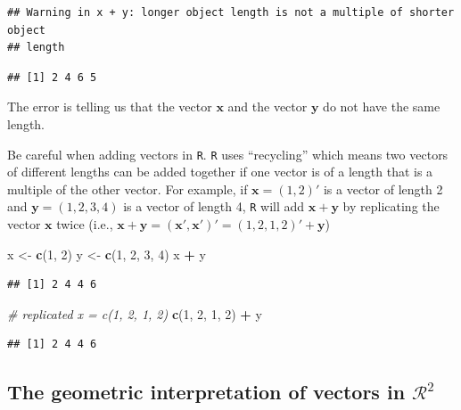 \documentclass[
]{book}
\newenvironment{Shaded}{\begin{snugshade}}{\end{snugshade}}
\newcommand{\CommentTok}[1]{\textcolor[rgb]{0.56,0.35,0.01}{\textit{#1}}}
\newcommand{\DecValTok}[1]{\textcolor[rgb]{0.00,0.00,0.81}{#1}}
\newcommand{\KeywordTok}[1]{\textcolor[rgb]{0.13,0.29,0.53}{\textbf{#1}}}
\newcommand{\NormalTok}[1]{#1}
\newcommand{\OperatorTok}[1]{\textcolor[rgb]{0.81,0.36,0.00}{\textbf{#1}}}
\newcommand{\StringTok}[1]{\textcolor[rgb]{0.31,0.60,0.02}{#1}}
\theoremstyle{definition}
\theoremstyle{definition}
\theoremstyle{definition}
\theoremstyle{remark}
\begin{document}
\begin{verbatim}
## Warning in x + y: longer object length is not a multiple of shorter object
## length
\end{verbatim}

\begin{verbatim}
## [1] 2 4 6 5
\end{verbatim}

The error is telling us that the vector \(\mathbf{x}\) and the vector \(\mathbf{y}\) do not have the same length.

Be careful when adding vectors in \texttt{R}. \texttt{R} uses ``recycling'' which means two vectors of different lengths can be added together if one vector is of a length that is a multiple of the other vector. For example, if \(\mathbf{x} = (1, 2)'\) is a vector of length 2 and \(\mathbf{y} = (1, 2, 3, 4)\) is a vector of length 4, \texttt{R} will add \(\mathbf{x} + \mathbf{y}\) by replicating the vector \(\mathbf{x}\) twice (i.e., \(\mathbf{x} + \mathbf{y} = \left( \mathbf{x}', \mathbf{x}' \right)' = \left(1, 2, 1, 2 \right)' + \mathbf{y}\))

\begin{Shaded}
\begin{Highlighting}[]
\NormalTok{x <-}\StringTok{ }\KeywordTok{c}\NormalTok{(}\DecValTok{1}\NormalTok{, }\DecValTok{2}\NormalTok{)}
\NormalTok{y <-}\StringTok{ }\KeywordTok{c}\NormalTok{(}\DecValTok{1}\NormalTok{, }\DecValTok{2}\NormalTok{, }\DecValTok{3}\NormalTok{, }\DecValTok{4}\NormalTok{)}
\NormalTok{x }\OperatorTok{+}\StringTok{ }\NormalTok{y}
\end{Highlighting}
\end{Shaded}

\begin{verbatim}
## [1] 2 4 4 6
\end{verbatim}

\begin{Shaded}
\begin{Highlighting}[]
\CommentTok{# replicated x = c(1, 2, 1, 2)}
\KeywordTok{c}\NormalTok{(}\DecValTok{1}\NormalTok{, }\DecValTok{2}\NormalTok{, }\DecValTok{1}\NormalTok{, }\DecValTok{2}\NormalTok{) }\OperatorTok{+}\StringTok{ }\NormalTok{y}
\end{Highlighting}
\end{Shaded}

\begin{verbatim}
## [1] 2 4 4 6
\end{verbatim}

\hypertarget{the-geometric-interpretation-of-vectors-in-mathcalr2}{%
\subsection{\texorpdfstring{The geometric interpretation of vectors in \(\mathcal{R}^2\)}{The geometric interpretation of vectors in \textbackslash mathcal\{R\}\^{}2}}\label{the-geometric-interpretation-of-vectors-in-mathcalr2}}
\end{document}
